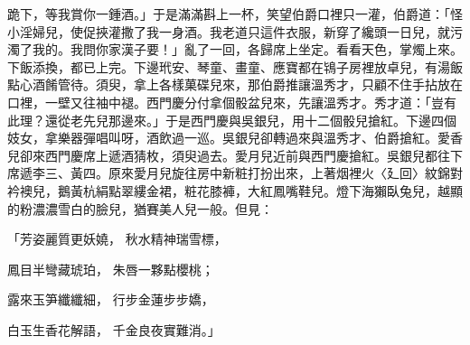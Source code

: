 \begin{showcontents}{}
跪下，等我賞你一鍾酒。」于是滿滿斟上一杯，笑望伯爵口裡只一灌，伯爵道：「怪小淫婦兒，使促挾灌撒了我一身酒。我老道只這件衣服，新穿了纔頭一日兒，就污濁了我的。我問你家漢子要！」亂了一回，各歸席上坐定。看看天色，掌燭上來。下飯添換，都已上完。下邊玳安、琴童、畫童、應寶都在鴇子房裡放卓兒，有湯飯點心酒餚管待。須臾，拿上各樣菓碟兒來，那伯爵推讓溫秀才，只顧不住手拈放在口裡，一壁又往袖中褪。西門慶分付拿個骰盆兒來，先讓溫秀才。秀才道：「豈有此理？還從老先兒那邊來。」于是西門慶與吳銀兒，用十二個骰兒搶紅。下邊四個妓女，拿樂器彈唱叫呀，酒飲過一巡。吳銀兒卻轉過來與溫秀才、伯爵搶紅。愛香兒卻來西門慶席上遞酒猜枚，須臾過去。愛月兒近前與西門慶搶紅。吳銀兒都往下席遞李三、黃四。原來愛月兒旋往房中新粧打扮出來，上著烟裡火〈廴回〉紋錦對衿襖兒，鵝黃杭絹點翠縷金裙，粧花膝褲，大紅鳳嘴鞋兒。燈下海獺臥兔兒，越顯的粉濃濃雪白的臉兒，猶賽美人兒一般。但見：

「芳姿麗質更妖嬈，  秋水精神瑞雪標，

鳳目半彎藏琥珀，  朱唇一夥點櫻桃；

露來玉笋纖纖細，  行步金蓮步步嬌，

白玉生香花解語，  千金良夜實難消。」


\end{showcontents}

